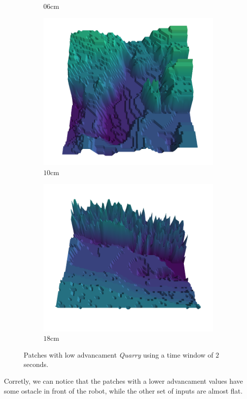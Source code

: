 \documentclass[../document.tex]{subfiles}
\begin{document}
\begin{figure}[H]
\begin{subfigure}[b]{0.19\textwidth}
        \caption{$06$cm}
        \end{subfigure}
        \begin{subfigure}[b]{0.19\textwidth}
        \includegraphics[width=\linewidth]{../img/5/quarry/all/worst/10-patch-3d-majavi-colormap-8.png}
        \caption{$10$cm}
        \end{subfigure}
        \begin{subfigure}[b]{0.19\textwidth}
        \includegraphics[width=\linewidth]{../img/5/quarry/all/worst/18-patch-3d-majavi-colormap-9.png}
        \caption{$18$cm}
        \end{subfigure}
        \caption{Patches with low advancament \emph{Quarry} using a time window of $2$seconds.}
    \end{figure}
Corretly, we can notice that the patches with a lower advancament values have some ostacle in front of the robot, while the other set of inputs are almost flat.
\end{document}
